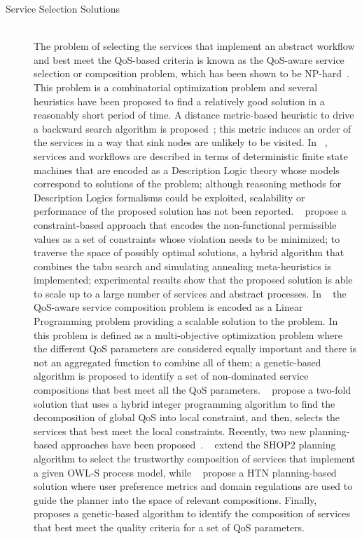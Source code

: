 \documentclass{llncs}
\begin{document}
\begin{description}
\item[Service Selection Solutions] \mbox{}\\
The problem of selecting the services that implement an abstract workflow and best meet the QoS-based criteria  is known as the QoS-aware service selection or composition problem, which has been shown to be NP-hard~\cite{Hiroshi2008}. This problem is a combinatorial optimization problem and several heuristics have been proposed to find a relatively good solution in a reasonably short period of time.  A  distance metric-based heuristic  to drive a backward search algorithm  is proposed~\cite{rahmani08}; this metric induces an order of the services in a way that sink nodes are unlikely to be visited. In ~\cite{berardi05,berardi08,berardi06}, services and workflows are described in terms of deterministic finite state machines that are encoded as a Description Logic theory whose models correspond to solutions of the problem;  although reasoning methods for Description Logics formalisms could be exploited, scalability or performance of the proposed solution has not been reported.  ~\cite{myoung08} propose a constraint-based approach that encodes the non-functional permissible values as a set of constraints whose violation needs to be minimized; to traverse the space of possibly optimal solutions, a hybrid algorithm that combines the tabu search and simulating annealing meta-heuristics is implemented; experimental results show that the proposed solution is able to scale up to a large number of services and abstract processes.  In ~\cite{cardellini07} the QoS-aware service composition problem is encoded as a Linear Programming problem providing a scalable solution to the problem.  In ~\cite{Hiroshi2008}  this problem  is defined as a multi-objective optimization problem where the different QoS parameters are considered equally important and there is not an aggregated function to combine all of them; a genetic-based algorithm is proposed to identify a set of non-dominated service compositions that best meet all the QoS parameters.  ~\cite{alrifaiR09} propose a two-fold solution that uses a hybrid integer programming algorithm to find the decomposition of global QoS into local constraint, and then,  selects the services that best meet the local constraints.   
Recently,  two new planning-based approaches have been proposed~\cite{kuterG09,sohrabiM09}.  ~\cite{kuterG09} extend the SHOP2 planning algorithm to select the trustworthy composition of services that implement a given OWL-S process model, while ~\cite{sohrabiM09}  propose a HTN planning-based solution where user preference metrics and domain regulations are used to guide the planner into the space of relevant compositions. Finally, ~\cite{lecue09} proposes a genetic-based algorithm to identify the composition of services that best meet the quality criteria for a set of QoS parameters.  


\end{description}
\end{document}
